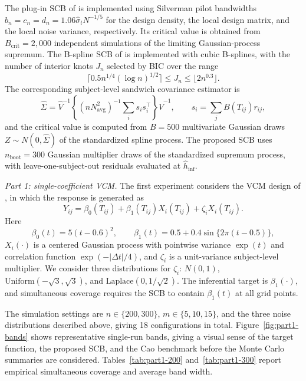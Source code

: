 The plug-in SCB of \citet{Cao2018} is implemented using Silverman pilot bandwidths
\(b_n=c_n=d_n=1.06\widehat\sigma_tN^{-1/5}\) for the design density, the local
design matrix, and the local noise variance, respectively. Its critical value
is obtained from \(B_{\mathrm{crit}}=2{,}000\) independent simulations of the
limiting Gaussian-process supremum. The B-spline SCB of \citet{CaiHu2025} is
implemented with cubic B-splines, with the number of interior knots \(J_n\)
selected by BIC over the range
\[
\lceil 0.5n^{1/4}(\log n)^{1/2}\rceil
\le J_n\le
\lfloor 2n^{0.3}\rfloor .
\]
The corresponding subject-level sandwich covariance estimator is
\[
\widehat\Sigma
=\widehat V^{-1}
\left\{(nN_{\mathrm{avg}}^2)^{-1}\sum_i s_is_i^\top\right\}
\widehat V^{-1},
\qquad
s_i=\sum_jB(T_{ij})r_{ij},
\]
and the critical value is computed from \(B=500\) multivariate Gaussian draws
\(Z\sim N(0,\widehat\Sigma)\) of the standardized spline process. The proposed
SCB uses \(n_{\mathrm{boot}}=300\) Gaussian multiplier draws of the standardized
supremum process, with leave-one-subject-out residuals evaluated at
\(\hat h_{\mathrm{inf}}\).

\emph{Part 1: single-coefficient VCM.}
The first experiment considers the VCM design of \citet{Cao2018}, in which the response is
generated as
\begin{equation}
\label{eq:part1-dgp}
Y_{ij}=\beta_0(T_{ij})+\beta_1(T_{ij})X_i(T_{ij})
       +\zeta_iX_i(T_{ij}).
\end{equation}
Here
\[
\beta_0(t)=5(t-0.6)^2,\qquad
\beta_1(t)=0.5+0.4\sin\{2\pi(t-0.5)\},
\]
\(X_i(\cdot)\) is a centered Gaussian process with pointwise variance
\(\exp(t)\) and correlation function \(\exp(-|\Delta t|/4)\), and
\(\zeta_i\) is a unit-variance subject-level multiplier. We consider three
distributions for \(\zeta_i\): \(N(0,1)\),
\(\mathrm{Uniform}(-\sqrt3,\sqrt3)\), and
\(\mathrm{Laplace}(0,1/\sqrt2)\). The inferential target is
\(\beta_1(\cdot)\), and simultaneous coverage requires the SCB to contain
\(\beta_1(t)\) at all grid points.

The simulation settings are \(n\in\{200,300\}\), \(m\in\{5,10,15\}\), and the
three noise distributions described above, giving 18 configurations in total.
Figure~\ref{fig:part1-bands} shows representative single-run bands, giving a
visual sense of the target function, the proposed SCB, and the Cao benchmark
before the Monte Carlo summaries are considered. Tables~\ref{tab:part1-200}
and~\ref{tab:part1-300} report empirical
simultaneous coverage and average band width.

